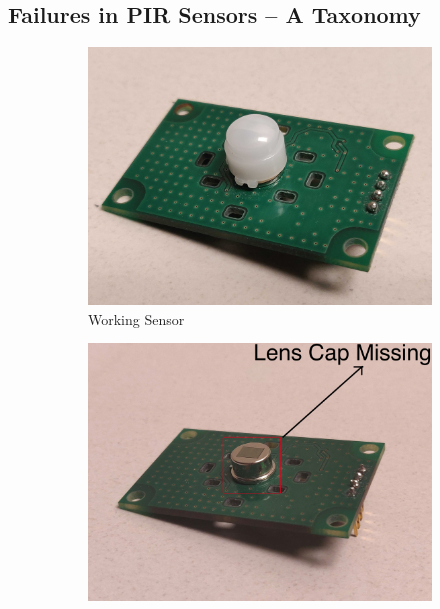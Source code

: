 \subsection{Failures in PIR Sensors -- A Taxonomy} 
\label{subsec:taxonomy} 

\begin{figure}%
	\centering
	\small
	\begin{subfigure}[t]{0.24\textwidth}
		\centering
		\includegraphics[width=\textwidth]{figures/platform/failure_photographs/WorkingSensor-proper.jpg}
		\caption{\footnotesize Working Sensor}
		\label{fig:working}
	\end{subfigure}
	\hspace{0.10ex}%
	\begin{subfigure}[t]{0.24\textwidth}
		\centering
		\includegraphics[width=\textwidth]{figures/platform/failure_photographs/ClassI-LensCapRemoved-annotated-jpg.jpg}

\end{subfigure}
\end{figure}

